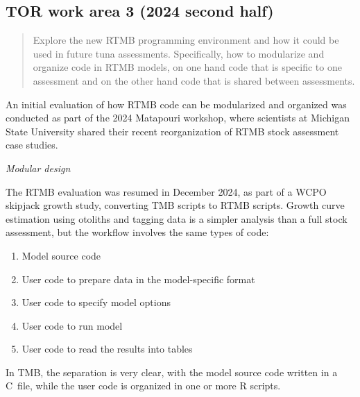 \documentclass{SCreport}
\newcommand\cpp{\mbox{C\raisebox{0.5ex}{\tiny\bfseries ++}}}
\begin{document}
\vspace{2ex}

\hypertarget{link:tor-3}{}
\subsection{TOR work area 3 (2024 second half)}
\label{sec:tor-3}

\begin{quote}\sf
  Explore the new RTMB programming environment and how it could be used in
  future tuna assessments. Specifically, how to modularize and organize code in
  RTMB models, on one hand code that is specific to one assessment and on the
  other hand code that is shared between assessments.
\end{quote}

\vspace{2ex}

An initial evaluation of how RTMB code can be modularized and organized was
conducted as part of the 2024 Matapouri workshop, where scientists at Michigan
State University shared their recent reorganization of RTMB stock assessment
case studies.

\vspace{2ex}

\textit{Modular design}

The RTMB evaluation was resumed in December 2024, as part of a WCPO skipjack
growth study, converting TMB scripts to RTMB scripts. Growth curve estimation
using otoliths and tagging data is a simpler analysis than a full stock
assessment, but the workflow involves the same types of code:

\begin{enumerate}
  \item Model source code\\[-4.5ex]
  \item User code to prepare data in the model-specific format\\[-4.5ex]
  \item User code to specify model options\\[-4.5ex]
  \item User code to run model\\[-4.5ex]
  \item User code to read the results into tables\\[-2.5ex]
\end{enumerate}

In TMB, the separation is very clear, with the model source code written in a
\cpp\ file, while the user code is organized in one or more R scripts.
\end{document}
